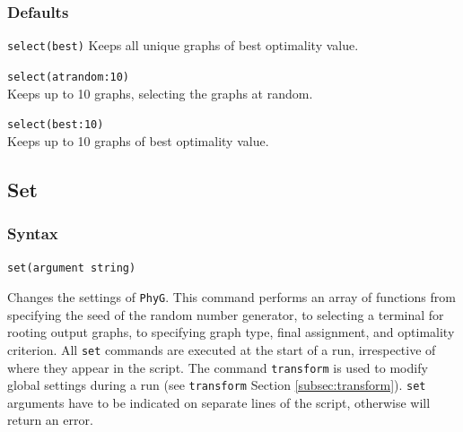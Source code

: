 	\subsubsection{Defaults}
		\texttt{select(best)} Keeps all unique graphs of best optimality value.
		
	\begin{example}
		\item{\texttt{select(atrandom:10)}\\ Keeps up to 10 graphs, selecting the graphs
		 at random.}
						
		\item{\texttt{select(best:10)}\\ Keeps up to 10 graphs of best optimality value.}
	\end{example}

\subsection{Set}
\label{subsec:set}
	\subsubsection{Syntax}
		\texttt{set(argument string)}
	
	\begin{phygdescription}
		{Changes the settings of \texttt{PhyG}. This command performs an array of functions
		from specifying the seed of the random number generator, to selecting a terminal for
		rooting output graphs, to specifying  graph type, final assignment, and optimality 
		criterion. All \texttt{set} commands are executed at the start of a run, irrespective of
		where they appear in the script. The command \texttt{transform} is used to modify 
		global settings during a run (see \texttt{transform} Section \ref{subsec:transform}).
		\texttt{set} arguments have to be indicated on separate lines of the script, otherwise
		\phyg will return an error.}
	\end{phygdescription}
			

